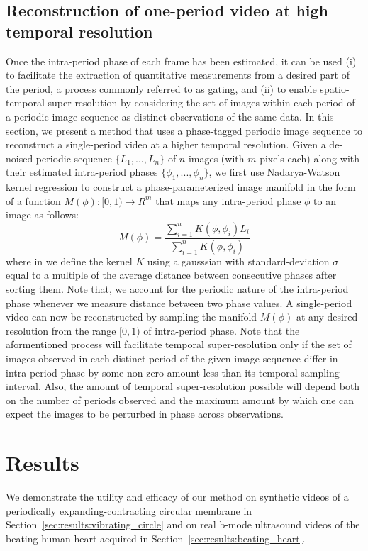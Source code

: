 \documentclass[runningheads,a4paper]{llncs}
\begin{document}
\subsection{Reconstruction of one-period video at high temporal resolution}
\label{sec:method:super-resolution}
%
Once the intra-period phase of each frame has been estimated, it can be used (i) to facilitate the extraction of quantitative measurements from a desired part of the period, a process commonly referred to as gating, and (ii) to enable spatio-temporal super-resolution by considering the set of images within each period of a periodic image sequence as distinct observations of the same data. In this section, we present a method that uses a phase-tagged periodic image sequence to reconstruct a single-period video at a higher temporal resolution.  Given a de-noised periodic sequence $\{L_1, ..., L_n\}$ of $n$ images (with $m$ pixels each) along with their estimated intra-period phases $\{\phi_1, ..., \phi_n\}$, we first use Nadarya-Watson kernel regression\cite{Bishop2006} to construct a phase-parameterized image manifold in the form of a function $M(\phi): [0, 1) \to R^m $ that maps any intra-period phase $\phi$ to an image as follows:
\begin{equation}
M(\phi) = \frac{\sum_{i = 1}^{n} K(\phi, \phi_i) L_i}{\sum_{i = 1}^{n} K(\phi, \phi_i)} 
\end{equation}
where in we define the kernel $K$ using a gausssian with standard-deviation $\sigma$ equal to a multiple of the average distance between consecutive phases after sorting them. Note that, we account for the periodic nature of the intra-period phase whenever we measure distance between two phase values. A single-period video can now be reconstructed by sampling the manifold $M(\phi)$ at any desired resolution from the range $[0, 1)$ of intra-period phase. Note that the aformentioned process will facilitate temporal super-resolution only if the set of images observed in each distinct period of the given image sequence differ in intra-period phase by some non-zero amount less than its temporal sampling interval. Also, the amount of temporal super-resolution possible will depend both on the number of periods observed and the maximum amount by which one can expect the images to be perturbed in phase across observations. 
\vspace{-0.5cm}
\section{Results}
\label{sec:results}
We demonstrate the utility and efficacy of our method on synthetic videos of a periodically expanding-contracting circular membrane in Section~\ref{sec:results:vibrating_circle} and on real b-mode ultrasound videos of the beating human heart acquired in Section~\ref{sec:results:beating_heart}. 
\vspace{-0.5cm}
\end{document}
